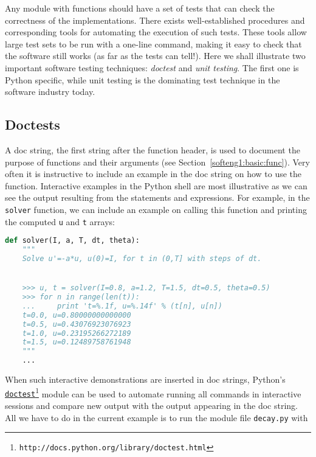 \documentclass[graybox,sectrefs,envcountresetchap,open=right,final]{svmonodo}
\begin{document}
Any module with functions should have a set of tests that can
check the
correctness of the implementations.
There exists
well-established procedures and corresponding tools for automating
the execution of such tests. These tools allow large test sets to be
run with a one-line command, making it easy to check that the
software still works (as far as the
tests can tell!). Here we shall illustrate two important
software testing techniques: \emph{doctest} and \emph{unit testing}.
The first one is Python specific, while unit testing is the dominating
test technique in the software industry today.

\subsection{Doctests}
\label{softeng1:verify:doctests}



A doc string, the first string after the function header, is used to
document the purpose of functions and their arguments
(see Section~\ref{softeng1:basic:func}). Very often it
is instructive to include an example in the doc string
on how to use the function.
Interactive examples in the Python shell are most illustrative as
we can see the output resulting from the statements and expressions.
For example,
in the \texttt{solver} function, we can include an example on calling
this function and printing the computed \texttt{u} and \texttt{t} arrays:

\begin{lstlisting}[language=Python,style=blue1_bluegreen]
def solver(I, a, T, dt, theta):
    """
    Solve u'=-a*u, u(0)=I, for t in (0,T] with steps of dt.


    >>> u, t = solver(I=0.8, a=1.2, T=1.5, dt=0.5, theta=0.5)
    >>> for n in range(len(t)):
    ...     print 't=%.1f, u=%.14f' % (t[n], u[n])
    t=0.0, u=0.80000000000000
    t=0.5, u=0.43076923076923
    t=1.0, u=0.23195266272189
    t=1.5, u=0.12489758761948
    """
    ...
\end{lstlisting}

When such interactive demonstrations are inserted in doc strings,
Python's \href{{http://docs.python.org/library/doctest.html}}{\nolinkurl{doctest}\footnote{\texttt{http://docs.python.org/library/doctest.html}}}
module can be used to automate running all commands
in interactive sessions and compare new output with the output
appearing in the doc string.  All we have to do in the current example
is to run the module file \texttt{decay.py} with
\end{document}
